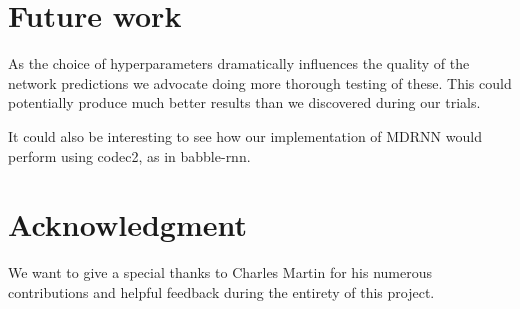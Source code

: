 \documentclass[conference]{IEEEtran}
\begin{document}
\section{Future work}
As the choice of hyperparameters dramatically influences the quality of the network predictions we advocate doing more thorough testing of these. This could potentially produce much better results than we discovered during our trials.

It could also be interesting to see how our implementation of MDRNN would perform using codec2, as in babble-rnn.

\section*{Acknowledgment}
We want to give a special thanks to Charles Martin for his numerous contributions and helpful feedback during the entirety of this project.
\end{document}
